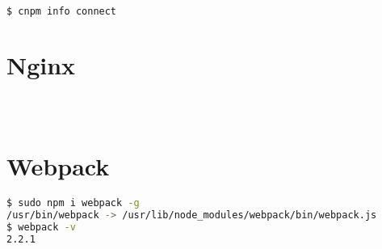\begin{lstlisting}[language=bash]
$ cnpm info connect
\end{lstlisting}


\section{Nginx}




\begin{lstlisting}[language=bash]

\end{lstlisting}


\begin{lstlisting}[language=bash]

\end{lstlisting}


\begin{lstlisting}[language=bash]

\end{lstlisting}

\section{Webpack}


\begin{lstlisting}[language=bash]
$ sudo npm i webpack -g
/usr/bin/webpack -> /usr/lib/node_modules/webpack/bin/webpack.js
$ webpack -v
2.2.1
\end{lstlisting}